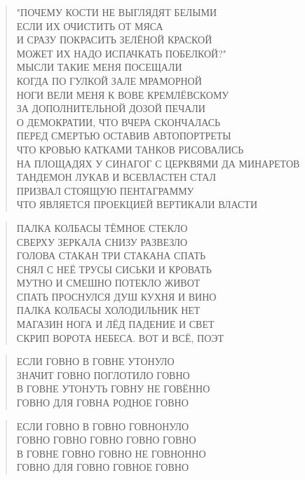 \poemtitle{***}
\begin{verse}
"ПОЧЕМУ КОСТИ НЕ ВЫГЛЯДЯТ БЕЛЫМИ\\
ЕСЛИ ИХ ОЧИСТИТЬ ОТ МЯСА\\
И СРАЗУ ПОКРАСИТЬ ЗЕЛЁНОЙ КРАСКОЙ\\
МОЖЕТ ИХ НАДО ИСПАЧКАТЬ ПОБЕЛКОЙ?"\\
МЫСЛИ ТАКИЕ МЕНЯ ПОСЕЩАЛИ\\
КОГДА ПО ГУЛКОЙ ЗАЛЕ МРАМОРНОЙ\\
НОГИ ВЕЛИ МЕНЯ К ВОВЕ КРЕМЛЁВСКОМУ\\
ЗА ДОПОЛНИТЕЛЬНОЙ ДОЗОЙ ПЕЧАЛИ\\
О ДЕМОКРАТИИ, ЧТО ВЧЕРА СКОНЧАЛАСЬ\\
ПЕРЕД СМЕРТЬЮ ОСТАВИВ АВТОПОРТРЕТЫ\\
ЧТО КРОВЬЮ КАТКАМИ ТАНКОВ РИСОВАЛИСЬ\\
НА ПЛОЩАДЯХ У СИНАГОГ С ЦЕРКВЯМИ ДА МИНАРЕТОВ\\
ТАНДЕМОН ЛУКАВ И ВСЕВЛАСТЕН СТАЛ\\
ПРИЗВАЛ СТОЯЩУЮ ПЕНТАГРАММУ \\
ЧТО ЯВЛЯЕТСЯ ПРОЕКЦИЕЙ ВЕРТИКАЛИ ВЛАСТИ
\end{verse}

\poemtitle{***}
\begin{verse}
ПАЛКА КОЛБАСЫ ТЁМНОЕ СТЕКЛО\\
СВЕРХУ ЗЕРКАЛА СНИЗУ РАЗВЕЗЛО\\
ГОЛОВА СТАКАН ТРИ СТАКАНА СПАТЬ\\
СНЯЛ С НЕЁ ТРУСЫ СИСЬКИ И КРОВАТЬ\\
МУТНО И СМЕШНО ПОТЕКЛО ЖИВОТ\\
СПАТЬ ПРОСНУЛСЯ ДУШ КУХНЯ И ВИНО\\
ПАЛКА КОЛБАСЫ ХОЛОДИЛЬНИК НЕТ\\
МАГАЗИН НОГА И ЛЁД ПАДЕНИЕ И СВЕТ\\
СКРИП ВОРОТА НЕБЕСА. ВОТ И ВСЁ, ПОЭТ
\end{verse}

\poemtitle{***}
\begin{verse}
ЕСЛИ ГОВНО В ГОВНЕ УТОНУЛО\\
ЗНАЧИТ ГОВНО ПОГЛОТИЛО ГОВНО\\
В ГОВНЕ УТОНУТЬ ГОВНУ НЕ ГОВЁННО\\
ГОВНО ДЛЯ ГОВНА РОДНОЕ ГОВНО
\end{verse}

\poemtitle{***}
\begin{verse}
ЕСЛИ ГОВНО В ГОВНО ГОВНОНУЛО\\
ГОВНО ГОВНО ГОВНО ГОВНО ГОВНО\\
В ГОВНЕ ГОВНО ГОВНО НЕ ГОВНОННО\\
ГОВНО ДЛЯ ГОВНО ГОВНОЕ ГОВНО
\end{verse}


